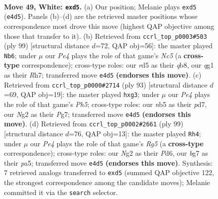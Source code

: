 \documentclass[11pt]{article}
\begin{document}
\clearpage

\begin{figure}[p]\centering
\begin{subfigure}{0.46\textwidth}\centering
\resizebox{\linewidth}{!}{%
\newchessgame
\chessboard[
  setfen={6k1/1r3pb1/R7/1n1rp1R1/4P3/3K4/3N2N1/6q1 w - - 0 49},
  showmover=false,
  pgfstyle=straightmove, color=movearrow, markmove={e4-d5}
]}
\caption{}
\end{subfigure}\hfill
\begin{subfigure}{0.46\textwidth}\centering
\resizebox{\linewidth}{!}{%
\newchessgame
\chessboard[
  setfen={1Q6/7r/4r2P/1kn5/1pn5/8/P1P5/2K4R b - - 22 50},
  showmover=false,
  pgfstyle=straightmove, color=movearrow, markmove={c4-b6}
]}
\caption{}
\end{subfigure}
\\[4pt]
\begin{subfigure}{0.46\textwidth}\centering
\resizebox{\linewidth}{!}{%
\newchessgame
\chessboard[
  setfen={8/R2P2pk/5R2/6r1/P6p/6B1/2r4P/6K1 b - - 0 47},
  showmover=false,
  pgfstyle=straightmove, color=movearrow, markmove={h4-g3}
]}
\caption{}
\end{subfigure}\hfill
\begin{subfigure}{0.46\textwidth}\centering
\resizebox{\linewidth}{!}{%
\newchessgame
\chessboard[
  setfen={8/4k3/r2p4/P1pPn1p1/4B1r1/R7/5P2/4RK2 b - - 6 50},
  showmover=false,
  pgfstyle=straightmove, color=movearrow, markmove={g4-h4}
]}
\caption{}
\end{subfigure}
\caption{\textbf{Move 49, White: \texttt{exd5}.} (a) Our position; Melanie plays \texttt{exd5} (\texttt{e4d5}). Panels (b)--(d) are the retrieved master positions whose correspondence most drove this move (highest QAP objective among those that transfer to it). (b) Retrieved from \texttt{ccrl\_top\_p0003\#503} (ply 99) [structural distance $d$=72, QAP obj=56]: the master played \texttt{Nb6}; under $\mu$ our \emph{Pe4} plays the role of that game's \emph{Nc5} (a \textbf{cross-type} correspondence); cross-type roles: our \emph{r}d5 as their \emph{q}b8, our \emph{q}g1 as their \emph{R}h7; transferred move \texttt{e4d5} \textbf{(endorses this move)}. (c) Retrieved from \texttt{ccrl\_top\_p0000\#2714} (ply 93) [structural distance $d$=69, QAP obj=19]: the master played \texttt{hxg3}; under $\mu$ our \emph{Pe4} plays the role of that game's \emph{Ph5}; cross-type roles: our \emph{n}b5 as their \emph{p}d7, our \emph{N}g2 as their \emph{P}g7; transferred move \texttt{e4d5} \textbf{(endorses this move)}. (d) Retrieved from \texttt{ccrl\_top\_p0002\#2661} (ply 99) [structural distance $d$=76, QAP obj=13]: the master played \texttt{Rh4}; under $\mu$ our \emph{Pe4} plays the role of that game's \emph{Rg5} (a \textbf{cross-type} correspondence); cross-type roles: our \emph{N}g2 as their \emph{P}d6, our \emph{b}g7 as their \emph{p}a5; transferred move \texttt{e4d5} \textbf{(endorses this move)}. Synthesis: 7 retrieved analogs transferred to \texttt{exd5} (summed QAP objective 122, the strongest correspondence among the candidate moves); Melanie committed it via the \texttt{search} selector.}
\label{fig:thought-m96}
\end{figure}
\end{document}
